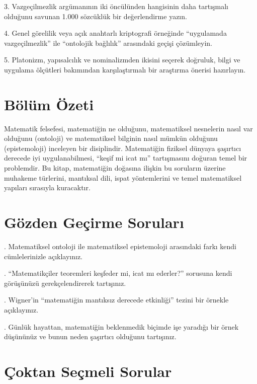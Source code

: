 3. Vazgeçilmezlik argümanının iki öncülünden hangisinin daha tartışmalı olduğunu savunan 1.000 sözcüklük bir değerlendirme yazın.

4. Genel görelilik veya açık anahtarlı kriptografi örneğinde “uygulamada vazgeçilmezlik” ile “ontolojik bağlılık” arasındaki geçişi çözümleyin.

5. Platonizm, yapısalcılık ve nominalizmden ikisini seçerek doğruluk, bilgi ve uygulama ölçütleri bakımından karşılaştırmalı bir araştırma önerisi hazırlayın.

\section*{Bölüm Özeti}

Matematik felsefesi, matematiğin ne olduğunu, matematiksel nesnelerin nasıl var olduğunu (ontoloji) ve matematiksel bilginin nasıl mümkün olduğunu (epistemoloji) inceleyen bir disiplindir. Matematiğin fiziksel dünyaya şaşırtıcı derecede iyi uygulanabilmesi, “keşif mi icat mı” tartışmasını doğuran temel bir problemdir. Bu kitap, matematiğin doğasına ilişkin bu soruların üzerine muhakeme türlerini, mantıksal dili, ispat yöntemlerini ve temel matematiksel yapıları sırasıyla kuracaktır.

\section*{Gözden Geçirme Soruları}

\par{}. Matematiksel ontoloji ile matematiksel epistemoloji arasındaki farkı kendi cümlelerinizle açıklayınız.

\par{}. “Matematikçiler teoremleri keşfeder mi, icat mı ederler?” sorusuna kendi görüşünüzü gerekçelendirerek tartışınız.

\par{}. Wigner’in “matematiğin mantıksız derecede etkinliği” tezini bir örnekle açıklayınız.

\par{}. Günlük hayattan, matematiğin beklenmedik biçimde işe yaradığı bir örnek düşününüz ve bunun neden şaşırtıcı olduğunu tartışınız.

\section*{Çoktan Seçmeli Sorular}

